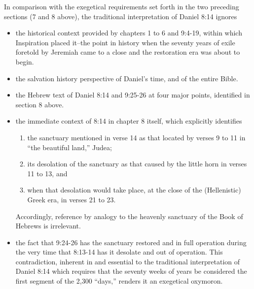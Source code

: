 In comparison with the exegetical requirements set forth in the two
preceding sections (7 and 8 above), the traditional interpretation of Daniel
8:14 ignores
\begin{itemize}
	\item the historical context provided by chapters 1 to 6 and 9:4-19, within
which Inspiration placed it--the point in history when the seventy years of
exile foretold by Jeremiah came to a close and the restoration era was
about to begin.
\newpage
	\item the salvation history perspective of Daniel's time, and of the entire
Bible.
	\item the Hebrew text of Daniel 8:14 and 9:25-26 at four major points,
identified in section 8 above.
	\item the immediate context of 8:14 in chapter 8 itself, which explicitly
identifies
	\begin{enumerate}
		\item the sanctuary mentioned in verse 14 as that located by verses
9 to 11 in ``the beautiful land,'' Judea; 
		\item its desolation of the sanctuary
as that caused by the little horn in verses 11 to 13, and 
		\item when that
desolation would take place, at the close of the (Hellenistic) Greek era, in
verses 21 to 23.
	\end{enumerate}
	Accordingly, reference by analogy to the heavenly sanctuary
	of the Book of Hebrews is irrelevant.

	\item the fact that 9:24-26 has the sanctuary restored and in full operation
during the very time that 8:13-14 has it desolate and out of operation. This
contradiction, inherent in and essential to the traditional interpretation
of Daniel 8:14 which requires that the seventy weeks of years be considered
the first segment of the 2,300 ``days,'' renders it an exegetical oxymoron.
\end{itemize}

